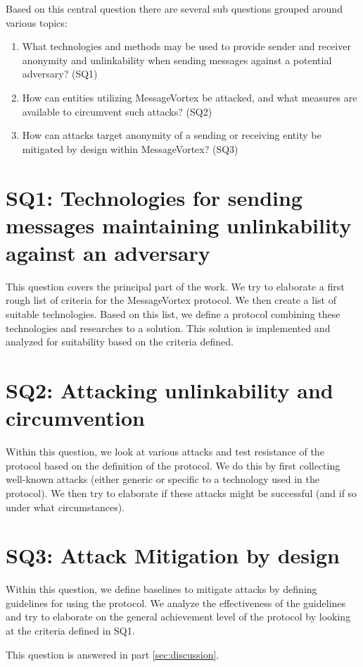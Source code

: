 Based on this central question there are several sub questions grouped around various topics:

\begin{enumerate}
	\item What technologies and methods may be used to provide sender and receiver anonymity and unlinkability when sending messages against a potential adversary? (SQ1)
	\item How can entities utilizing MessageVortex be attacked, and what measures are available to circumvent such attacks? (SQ2)
	\item How can attacks target anonymity of a sending or receiving entity be mitigated by design within MessageVortex? (SQ3)
\end{enumerate}

\section{SQ1: Technologies for sending messages maintaining unlinkability against an adversary}
This question covers the principal part of the work. We try to elaborate a first rough list of criteria for the MessageVortex protocol. We then create a list of suitable technologies. Based on this list, we define a protocol combining these technologies and researches to a solution. This solution is implemented and analyzed for suitability based on the criteria defined.

\section{SQ2: Attacking unlinkability and circumvention}
Within this question, we look at various attacks and test resistance of the protocol based on the definition of the protocol. We do this by first collecting well-known attacks (either generic or specific to a technology used in the protocol). We then try to elaborate if these attacks might be successful (and if so under what circumstances).

\section{SQ3: Attack Mitigation by design}
Within this question, we define baselines to mitigate attacks by defining guidelines for using the protocol. We analyze the effectiveness of the guidelines and try to elaborate on the general achievement level of the protocol by looking at the criteria defined in SQ1. 

This question is answered in part \ref{sec:discussion}.